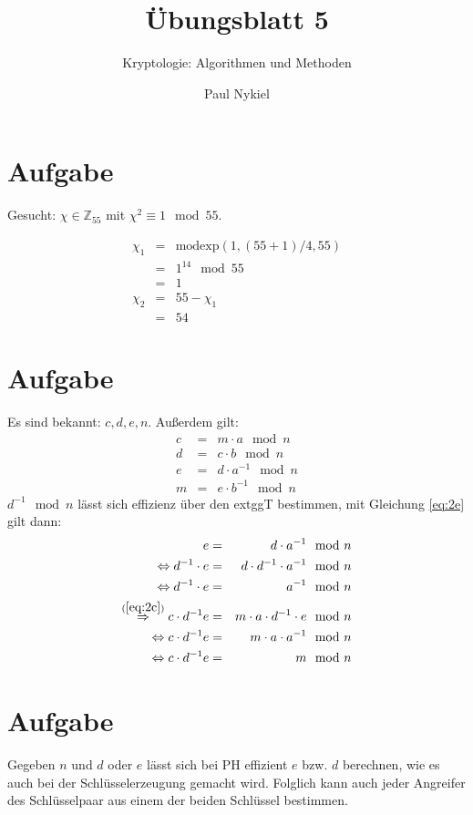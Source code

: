 \documentclass[DIN, pagenumber=false, fontsize=11pt, parskip=half]{scrartcl}
\title{Übungsblatt 5}
\subtitle{Kryptologie: Algorithmen und Methoden}
\author{Paul Nykiel}
\begin{document}
    \maketitle
    \section{Aufgabe}
    Gesucht: $\chi \in \mathbb{Z}_{55}$ mit $\chi^2 \equiv 1\mod 55$.

    \begin{eqnarray}
        \chi_1 &=& \text{modexp}(1, (55 + 1)/4, 55) \\
               &=& 1^{14} \mod 55 \\
               &=& 1 \\
        \chi_2 &=& 55-\chi_1 \\
               &=& 54
    \end{eqnarray}

    \section{Aufgabe}
    Es sind bekannt: $c, d, e, n$. Außerdem gilt:
    \begin{eqnarray}
        c &=& m \cdot a \mod n \label{eq:2c} \\
        d &=& c \cdot b \mod n \label{eq:2d} \\
        e &=& d \cdot a^{-1} \mod n \label{eq:2e} \\
        m &=& e \cdot b^{-1} \mod n \label{eq:2m}
    \end{eqnarray}
    $d^{-1} \mod n$ lässt sich effizienz über den extggT bestimmen, 
    mit Gleichung \ref{eq:2e} gilt dann:
    \begin{eqnarray}
        e &=& d \cdot a^{-1} \mod n \\
        \Leftrightarrow d^{-1} \cdot e &=& d \cdot d^{-1} \cdot a^{-1} \mod n\\
        \Leftrightarrow d^{-1} \cdot e &=& a^{-1} \mod n\\
        \stackrel{(\ref{eq:2c})}{\Rightarrow} c \cdot d^{-1} e &=& m \cdot a \cdot d^{-1} \cdot e \mod n \\
        \Leftrightarrow c \cdot d^{-1} e &=& m \cdot a \cdot a^{-1} \mod n \\
        \Leftrightarrow c \cdot d^{-1} e &=& m \mod n
    \end{eqnarray} 

    \section{Aufgabe}
    Gegeben $n$ und $d$ oder $e$ lässt sich bei PH effizient $e$ bzw. $d$ berechnen,
    wie es auch bei der Schlüsselerzeugung gemacht wird.
    Folglich kann auch jeder Angreifer des Schlüsselpaar aus einem der beiden Schlüssel
    bestimmen.
\end{document}
